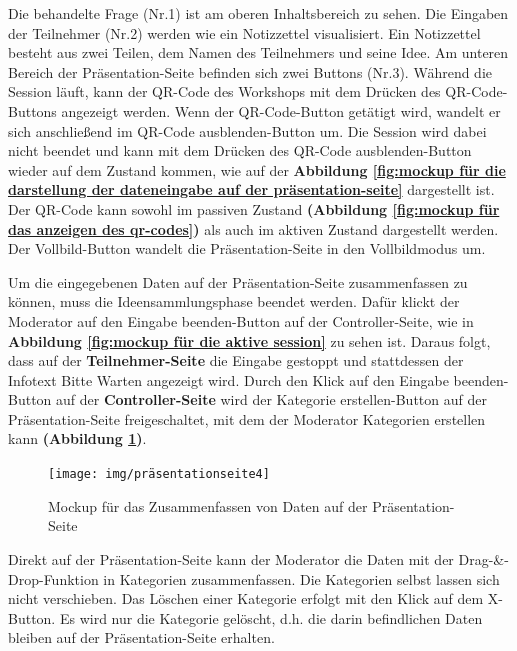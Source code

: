 \begin{itemize}
Die behandelte Frage (Nr.1) ist am oberen Inhaltsbereich zu sehen. Die Eingaben der Teilnehmer (Nr.2) werden wie ein Notizzettel visualisiert. Ein Notizzettel besteht aus zwei Teilen, dem Namen des Teilnehmers und seine Idee. Am unteren Bereich der Präsentation-Seite befinden sich zwei Buttons (Nr.3). Während die Session läuft, kann der QR-Code des Workshops mit dem Drücken des QR-Code-Buttons angezeigt werden. Wenn der QR-Code-Button getätigt wird, wandelt er sich anschließend im \glqq QR-Code ausblenden\grqq{}-Button um. Die Session wird dabei nicht beendet und kann mit dem Drücken des \glqq QR-Code ausblenden\grqq{}-Button wieder auf dem Zustand kommen, wie auf der \textbf{Abbildung \ref{fig:mockup für die darstellung der dateneingabe auf der präsentation-seite}} dargestellt ist. Der QR-Code kann sowohl im passiven Zustand \textbf{(Abbildung \ref{fig:mockup für das anzeigen des qr-codes})} als auch im aktiven Zustand dargestellt werden. Der Vollbild-Button wandelt die Präsentation-Seite in den Vollbildmodus um.\bigskip

Um die eingegebenen Daten auf der Präsentation-Seite zusammenfassen zu können, muss die Ideensammlungsphase beendet werden. Dafür klickt der Moderator auf den \glqq Eingabe beenden\grqq{}-Button auf der Controll\-er-Seite, wie in \textbf{Abbildung \ref{fig:mockup für die aktive session}} zu sehen ist. Daraus folgt, dass auf der \textbf{Teilnehmer-Seite} die Eingabe gestoppt und stattdessen der Infotext \glqq Bitte Warten\grqq{} angezeigt wird. Durch den Klick auf den \glqq Eingabe beenden\grqq{}- Button auf der \textbf{Controller-Seite} wird der \glqq Kategorie erstellen\grqq{}-Button auf der Präsentation-Seite freigeschaltet, mit dem der Moderator Kategorien erstellen kann \textbf{(Abbildung \ref{fig:mockup für zusammenfassung-modus auf der präsentation-seite})}.

\begin{figure}[H]
  \begin{center}
    \texttt{[image: img/präsentationseite4]}
	\caption{Mockup für das Zusammenfassen von Daten auf der Präsentation-Seite}  
	\label{fig:mockup für zusammenfassung-modus auf der präsentation-seite}
  \end{center}   
\end{figure}

Direkt auf der Präsentation-Seite kann der Moderator die Daten mit der Drag-\&-Drop-Funktion in Kategorien zusammenfassen. Die Kategorien selbst lassen sich nicht verschieben. Das Löschen einer Kategorie erfolgt mit den Klick auf dem X-Button. Es wird nur die Kategorie gelöscht, d.h. die darin befindlichen Daten bleiben auf der Präsentation-Seite erhalten.
\end{itemize}

